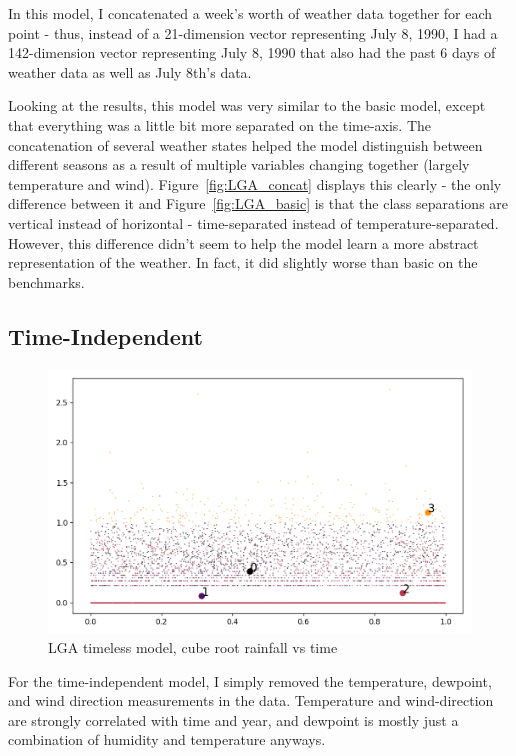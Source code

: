 \documentclass[a4paper]{article}
\begin{document}
In this model, I concatenated a week's worth of weather data together for each point - thus, instead of a 21-dimension vector representing July 8, 1990, I had a 142-dimension vector representing July 8, 1990 that also had the past 6 days of weather data as well as July 8th's data. 

Looking at the results, this model was very similar to the basic model, except that everything was a little bit more separated on the time-axis. The concatenation of several weather states helped the model distinguish between different seasons as a result of multiple variables changing together (largely temperature and wind). Figure~\ref{fig:LGA_concat} displays this clearly - the only difference between it and Figure~\ref{fig:LGA_basic} is that the class separations are vertical instead of horizontal - time-separated instead of temperature-separated. However, this difference didn't seem to help the model learn a more abstract representation of the weather. In fact, it did slightly worse than basic on the benchmarks.

\subsection{Time-Independent}
\begin{figure}[t]
  \centering
  \includegraphics[width=\linewidth]{../png/models/LGA-timeless-cuberootrain4.png}
  \caption{LGA timeless model, cube root rainfall vs time}
  \label{fig:LGA_timeless_rain}
\end{figure}

For the time-independent model, I simply removed the temperature, dewpoint, and wind direction measurements in the data. Temperature and wind-direction are strongly correlated with time and year, and dewpoint is mostly just a combination of humidity and temperature anyways. 
\end{document}
